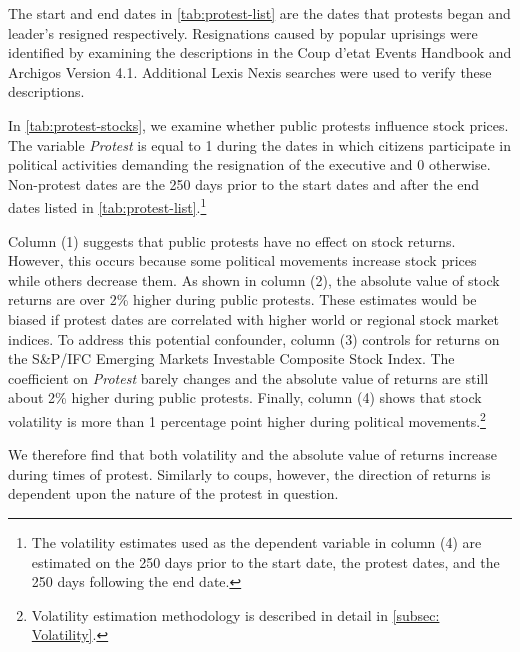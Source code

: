 \documentclass[12pt,final,fleqn]{article}
\theoremstyle{plain}
\begin{document}
The start and end dates in \autoref{tab:protest-list} are the dates that protests began and leader's resigned respectively. Resignations caused by popular uprisings were identified by examining the descriptions in the Coup d'etat Events Handbook and Archigos Version 4.1. Additional Lexis Nexis searches were used to verify these descriptions.

In \autoref{tab:protest-stocks}, we examine whether public protests influence stock prices. The variable \textit{Protest} is equal to 1 during the dates in which citizens participate in political activities demanding the resignation of the executive and 0 otherwise. Non-protest dates are the 250 days prior to the start dates and after the end dates listed in \autoref{tab:protest-list}.\footnote{The volatility estimates used as the dependent variable in column (4) are estimated on the 250 days prior to the start date, the protest dates, and the 250 days following the end date.}

Column (1) suggests that public protests have no effect on stock returns. However, this occurs because some political movements increase stock prices while others decrease them. As shown in column (2), the absolute value of stock returns are over 2\% higher during public protests. These estimates would be biased if protest dates are correlated with higher world or regional stock market indices. To address this potential confounder, column (3) controls for returns on the S\&P/IFC Emerging Markets Investable Composite Stock Index. The coefficient on \textit{Protest} barely changes and the absolute value of returns are still about 2\% higher during public protests. Finally, column (4) shows that stock volatility is more than 1 percentage point higher during political movements.\footnote{Volatility estimation methodology is described in detail in \autoref{subsec: Volatility}.}
 

We therefore find that both volatility and the absolute value of returns increase during times of protest. Similarly to coups, however, the direction of returns is dependent upon the nature of the protest in question. 
\end{document}
